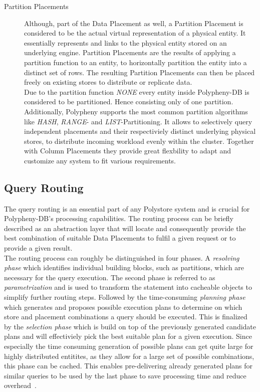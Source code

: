 \begin{description}
   

    \item [Partition Placements] Although, part of the Data Placement as well, a Partition Placement is considered to be the actual virtual representation of a physical entity.
    It essentially represents and links to the physical entity stored on an underlying engine. Partition Placements are the results of applying a partition function to an entity,
    to horizontally partition the entity into a distinct set of rows. The resulting Partition Placements can then be placed freely on existing stores to distribute or replicate data.\\
    Due to the partition function \emph{NONE} every entity inside Polypheny-DB is considered to be partitioned. Hence consisting only of one partition.
    Additionally, Polypheny supports the most common partition algorithms like \emph{HASH}, \emph{RANGE}- and \emph{LIST}-Partitioning. 
    It allows to selectively query independent placements and their respectiviely distinct underlying physical stores, to distribute incoming workload evenly within the cluster.
    Together with Column Placements they provide great flexbility to adapt and customize any system to fit various requirements.
    
\end{description}





\subsection{Query Routing}
\label{sec:routing}

The query routing is an essential part of any Polystore system and is crucial for Polypheny-DB's processing capabilities.
The routing process can be briefly described as an abstraction layer that will locate and consequently provide the best combination of suitable Data Placements to fulfil a given request 
or to provide a given result. \\
The routing process can roughly be distinguished in four phases. A \emph{resolving phase} which identifies individual building blocks, such as partitions, which are necessary 
for the query execution. The second phase is referred to as \emph{parametrization} and is used to transform the statement into cacheable objects to simplify further routing steps.
Followed by the time-consuming \emph{planning phase} which generates and proposes possible execution plans to determine on which store and placement combinations a query should be executed.
This is finalized by the \emph{selection phase} which is build on top of the previously generated candidate plans and will effectiviely pick the best suitable plan for a 
given execution. Since especially the time consuming generation of possible plans can get quite large for highly distributed entitites, as they allow for a large set of 
possible combinations, this phase can be cached.
This enables pre-delivering already generated plans for similar queries to be used by the last phase to save processing time and reduce overhead~\cite{vogt_dis_2022}.


